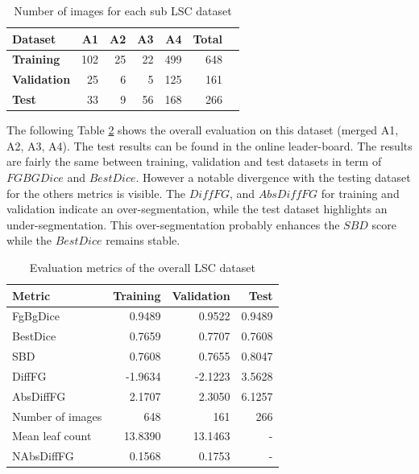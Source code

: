 \documentclass[../thesis.tex]{subfiles}
\begin{document}
    \begin{table}[H]
        \centering
        \begin{tabularx}{\linewidth}{|X|r|r|r|r|r|r|}
            \hline
            \textbf{Dataset} 	 &  A1  &  A2 &   A3 &  A4 & \textbf{Total} \\ \hline
            \textbf{Training}    & 102  &  25 &   22 & 499 & 648 \\
            \textbf{Validation}  &  25  &   6 &    5 & 125 & 161 \\
            \textbf{Test}        &  33  &   9 &   56 & 168 & 266 \\
            \hline
        \end{tabularx}
        \caption{Number of images for each sub LSC dataset}
        \label{tab:quantity-cvppp}
    \end{table}
    
    \newpage
    The following Table \ref{tab:eval-cvppp} shows the overall evaluation on this dataset (merged A1, A2, A3, A4). The test results can be found in the online leader-board. The results are fairly the same between training, validation and test datasets in term of $FGBGDice$ and $BestDice$. However a notable divergence with the testing dataset for the others metrics is visible. The $DiffFG$, and $AbsDiffFG$ for training and validation indicate an over-segmentation, while the test dataset highlights an under-segmentation. This over-segmentation probably enhances the $SBD$ score while the $BestDice$ remains stable.
    
    \begin{table}[H]
        \begin{tabularx}{\linewidth}{|X|r|r|r|}
            \hline
            \textbf{Metric} 	& \textbf{Training} & \textbf{Validation} &  \textbf{Test}  \\ \hline
            FgBgDice 			&   0.9489 &   0.9522   & 0.9489 \\
            BestDice 			&   0.7659 &   0.7707   & 0.7608 \\
            SBD 	            &   0.7608 &   0.7655   & 0.8047 \\
            DiffFG 		        &  -1.9634 &  -2.1223   & 3.5628 \\
            AbsDiffFG 	        &   2.1707 &   2.3050   & 6.1257 \\ \hline
            Number of images 	&      648 &      161   & 266    \\
            Mean leaf count 	&  13.8390 &  13.1463   & -      \\
            NAbsDiffFG          &   0.1568 &  0.1753    & -      \\
            \hline
        \end{tabularx}
        \caption{Evaluation metrics of the overall LSC dataset}
        \label{tab:eval-cvppp}
    \end{table}
    
\end{document}
